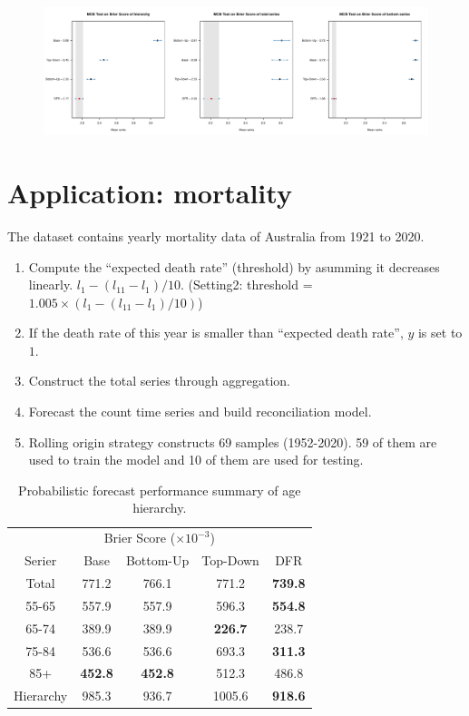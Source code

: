 \documentclass[a4paper,review,12pt,authoryear]{elsarticle}
\begin{document}
\begin{figure}[h]
  \centering
  \includegraphics[width=\textwidth]{figures/dc_crime_bs.pdf}
\end{figure}

\section{Application: mortality}

The dataset contains yearly mortality data of Australia from 1921 to 2020.

\begin{enumerate}
  \item Compute the ``expected death rate'' (threshold) by asumming it decreases linearly. $l_1 - (l_{11} - l_1)/10$. (Setting2: threshold = $1.005 \times (l_1 - (l_{11} - l_1) / 10)$)
  \item If the death rate of this year is smaller than ``expected death rate'', $y$ is set to $1$.
  \item Construct the total series through aggregation.
  \item Forecast the count time series and build reconciliation model.
  \item Rolling origin strategy constructs 69 samples (1952-2020). 59 of them are used to train the model and 10 of them are used for testing.
\end{enumerate}

\begin{table}[h]
  \centering
  \caption{\label{tab:mortality_age} Probabilistic forecast performance summary of age hierarchy.}
  \begin{tabular}{ccccc}
  \toprule
  \multicolumn{5}{c}{Brier Score ($\times 10^{-3}$)}\\ 
  Serier & Base & Bottom-Up & Top-Down & DFR \\\midrule
  Total & 771.2 & 766.1 & 771.2 & \textbf{739.8} \\
  55-65 & 557.9 & 557.9 & 596.3 & \textbf{554.8} \\
  65-74 & 389.9 & 389.9 & \textbf{226.7} & 238.7\\
  75-84 & 536.6 & 536.6 & 693.3 & \textbf{311.3}\\
  85+ & \textbf{452.8}& \textbf{452.8} & 512.3 & 486.8\\
  Hierarchy & 985.3 & 936.7 & 1005.6 & \textbf{918.6} \\
  \bottomrule
  \end{tabular}
\end{table}
\end{document}
